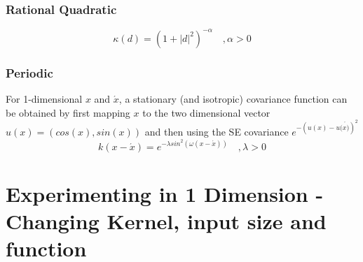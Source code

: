 \documentclass[]{IEEEtran}
\begin{document}
\begin{appendices}
\subsubsection{Rational Quadratic}
\begin{equation}
{ \kappa  }(d)={ \left( 1+{ \left| d \right|  }^{ 2 } \right)  }^{ -\alpha  }\quad,  \alpha >0
\label{kernel05}
\end{equation}\par
\subsubsection{ Periodic}
For 1-dimensional \(x\) and \(\acute { x }\), a stationary (and isotropic) covariance function can be obtained by ﬁrst mapping \(x\) to the two dimensional vector \(u(x) = (cos(x),sin(x))\) and then using the SE covariance \({ e }^{ -{ \left( u(x)-u(\acute { x) }  \right)  }^{ 2 } }\)
\begin{equation}
k(x-\acute { x } )={ e }^{ -\lambda { sin }^{ 2 }(\omega (x-\acute { x } )) }\quad ,\lambda >0
\label{kernel06}
\end{equation}



\newpage
\section{Experimenting in 1 Dimension - Changing Kernel, input size and function } \label{sec:appendix-2} 

\begin{figure}[!ht]
  \centering
  \hspace{1mm}
  \hspace{1mm}
  \hspace{1mm}
  

\end{figure}
\end{appendices}
\end{document}
